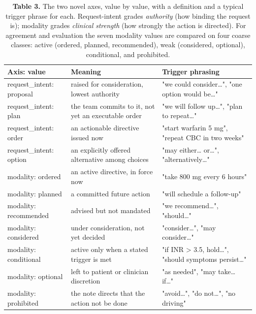 \documentclass[3p,twocolumn]{elsarticle}
\begin{document}
\begin{table}[ht]
\centering
\small\setlength{\tabcolsep}{4pt}%
\setlength{\tabcolsep}{4pt}
\begin{tabularx}{\linewidth}{>{\hsize=0.726\hsize\raggedright\arraybackslash}X >{\hsize=1.158\hsize\raggedright\arraybackslash}X >{\hsize=1.116\hsize\raggedright\arraybackslash}X}
\toprule
Axis: value & Meaning & Trigger phrasing \\
\midrule
request\_\allowbreak{}intent: proposal & raised for consideration, lowest authority & "we could consider\ldots", "one option would be\ldots" \\
request\_\allowbreak{}intent: plan & the team commits to it, not yet an executable order & "we will follow up\ldots", "plan to repeat\ldots" \\
request\_\allowbreak{}intent: order & an actionable directive issued now & "start warfarin 5 mg", "repeat CBC in two weeks" \\
request\_\allowbreak{}intent: option & an explicitly offered alternative among choices & "may either\ldots{} or\ldots", "alternatively\ldots" \\
modality: ordered & an active directive, in force now & "take 800 mg every 6 hours" \\
modality: planned & a committed future action & "will schedule a follow-up" \\
modality: recommended & advised but not mandated & "we recommend\ldots", "should\ldots" \\
modality: considered & under consideration, not yet decided & "consider\ldots", "may consider\ldots" \\
modality: conditional & active only when a stated trigger is met & "if INR \textgreater{} 3.5, hold\ldots", "should symptoms persist\ldots" \\
modality: optional & left to patient or clinician discretion & "as needed", "may take\ldots{} if\ldots" \\
modality: prohibited & the note directs that the action not be done & "avoid\ldots", "do not\ldots", "no driving" \\
\bottomrule
\end{tabularx}
\caption{\textbf{Table 3.} The two novel axes, value by value, with a definition and a typical trigger phrase for each. Request-intent grades \emph{authority} (how binding the request is); modality grades \emph{clinical strength} (how strongly the action is directed). For agreement and evaluation the seven modality values are compared on four coarse classes: active (ordered, planned, recommended), weak (considered, optional), conditional, and prohibited.}
\end{table}
\end{document}
